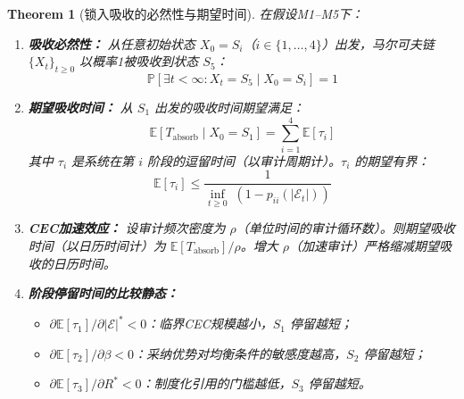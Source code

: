 \documentclass[12pt,a4paper]{ctexart}
\newtheorem{theorem}{Theorem}[section]
\theoremstyle{definition}
\theoremstyle{remark}
\begin{document}
\begin{theorem}[锁入吸收的必然性与期望时间]
\label{thm:absorption}
在假设M1--M5下：
\begin{enumerate}[label=(\roman*), itemsep=6pt]
\item \textbf{吸收必然性：} 从任意初始状态 $X_0 = S_i$（$i \in \{1, \ldots, 4\}$）出发，马尔可夫链 $\{X_t\}_{t \geq 0}$ 以概率1被吸收到状态 $S_5$：
\begin{equation}
\mathbb{P}\left[\exists t < \infty : X_t = S_5 \mid X_0 = S_i\right] = 1
\end{equation}

\item \textbf{期望吸收时间：} 从 $S_1$ 出发的吸收时间期望满足：
\begin{equation}
\mathbb{E}[T_{\text{absorb}} \mid X_0 = S_1] = \sum_{i=1}^{4} \mathbb{E}[\tau_i]
\end{equation}
其中 $\tau_i$ 是系统在第 $i$ 阶段的逗留时间（以审计周期计）。$\tau_i$ 的期望有界：
\begin{equation}
\mathbb{E}[\tau_i] \leq \frac{1}{\inf_{t \geq 0} \; (1 - p_{ii}(|\mathcal{E}_t|))}
\end{equation}

\item \textbf{CEC加速效应：} 设审计频次密度为 $\rho$（单位时间的审计循环数）。则期望吸收时间（以日历时间计）为 $\mathbb{E}[T_{\text{absorb}}] / \rho$。增大 $\rho$（加速审计）严格缩减期望吸收的日历时间。

\item \textbf{阶段停留时间的比较静态：}
\begin{itemize}
\item $\partial \mathbb{E}[\tau_1] / \partial |\mathcal{E}|^* < 0$：临界CEC规模越小，$S_1$ 停留越短；
\item $\partial \mathbb{E}[\tau_2] / \partial \beta < 0$：采纳优势对均衡条件的敏感度越高，$S_2$ 停留越短；
\item $\partial \mathbb{E}[\tau_3] / \partial R^* < 0$：制度化引用的门槛越低，$S_3$ 停留越短。
\end{itemize}
\end{enumerate}
\end{theorem}
\end{document}
